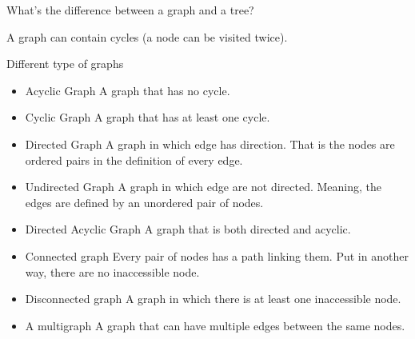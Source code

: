 \documentclass[ignorenonframetext,]{beamer}
\providecommand{\tightlist}{%
  \setlength{\itemsep}{0pt}\setlength{\parskip}{0pt}}
\begin{document}
\begin{frame}{What's the difference between a graph and a tree?}
\protect\hypertarget{whats-the-difference-between-a-graph-and-a-tree}{}

A graph can contain cycles (a node can be visited twice).

\end{frame}

\begin{frame}{Different type of graphs}
\protect\hypertarget{different-type-of-graphs}{}

\begin{itemize}
\tightlist
\item
  Acyclic Graph A graph that has no cycle.
\item
  Cyclic Graph A graph that has at least one cycle.
\item
  Directed Graph A graph in which edge has direction. That is the nodes
  are ordered pairs in the definition of every edge.
\item
  Undirected Graph A graph in which edge are not directed. Meaning, the
  edges are defined by an unordered pair of nodes.
\item
  Directed Acyclic Graph A graph that is both directed and acyclic.
\item
  Connected graph Every pair of nodes has a path linking them. Put in
  another way, there are no inaccessible node.
\item
  Disconnected graph A graph in which there is at least one inaccessible
  node.
\item
  A multigraph A graph that can have multiple edges between the same
  nodes.
\end{itemize}

\end{frame}
\end{document}
